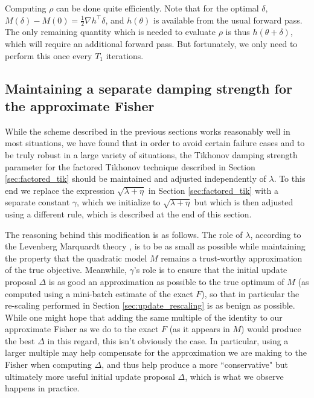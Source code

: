 \documentclass[12pt]{article}
\begin{document}
Computing $\rho$ can be done quite efficiently.  Note that for the optimal $\delta$, $M(\delta) - M(0) = \frac{1}{2} \nabla h^\top\delta$, and $h(\theta)$ is available from the usual forward pass.  The only remaining quantity which is needed to evaluate $\rho$ is thus $h(\theta + \delta)$, which will require an additional forward pass.  But fortunately, we only need to perform this once every $T_1$ iterations.


\subsection{Maintaining a separate damping strength for the approximate Fisher}
\label{sec:gamma}

While the scheme described in the previous sections works reasonably well in most situations, we have found that in order to avoid certain failure cases and to be truly robust in a large variety of situations, the Tikhonov damping strength parameter for the factored Tikhonov technique described in Section \ref{sec:factored_tik} should be maintained and adjusted independently of $\lambda$.  To this end we replace the expression $\sqrt{\lambda + \eta}$ in Section \ref{sec:factored_tik} with a separate constant $\gamma$, which we initialize to $\sqrt{\lambda + \eta}$ but which is then adjusted using a different rule, which is described at the end of this section.

The reasoning behind this modification is as follows.  The role of $\lambda$, according to the Levenberg Marquardt theory \citep{levenberg_marquardt}, is to be as small as possible while maintaining the property that the quadratic model $M$ remains a trust-worthy approximation of the true objective.  Meanwhile, $\gamma$'s role is to ensure that the initial update proposal $\Delta$ is as good an approximation as possible to the true optimum of $M$ (as computed using a mini-batch estimate of the exact $F$), so that in particular the re-scaling performed in Section \ref{sec:update_rescaling} is as benign as possible.  While one might hope that adding the same multiple of the identity to our approximate Fisher as we do to the exact $F$ (as it appears in $M$) would produce the best $\Delta$ in this regard, this isn't obviously the case.  In particular, using a larger multiple may help compensate for the approximation we are making to the Fisher when computing $\Delta$, and thus help produce a more ``conservative" but ultimately more useful initial update proposal $\Delta$, which is what we observe happens in practice.
\end{document}

